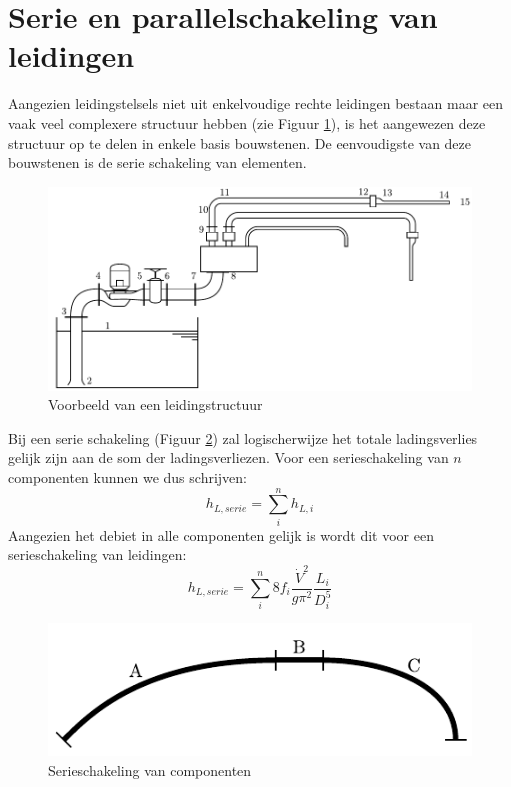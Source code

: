	\section{Serie en parallelschakeling van leidingen}
	\label{sec:Serie en parallelschakeling van leidingen}
Aangezien leidingstelsels niet uit enkelvoudige rechte leidingen bestaan maar een vaak veel complexere structuur hebben (zie Figuur \ref{fig:leiding_structuur}), is het aangewezen deze structuur op te delen in enkele basis bouwstenen. De eenvoudigste van deze bouwstenen is de serie schakeling van elementen.
\begin{figure}
	\centering
	\includegraphics{fig/leidingstelsels/leiding_structuur}
	\caption{Voorbeeld van een leidingstructuur}
	\label{fig:leiding_structuur}
\end{figure}
Bij een serie schakeling (Figuur \ref{fig:serieschakeling}) zal logischerwijze het totale ladingsverlies gelijk zijn aan de som der ladingsverliezen. Voor een serieschakeling van $n$ componenten kunnen we dus schrijven:
\begin{equation}
h_{L,serie} = \sum_i^n h_{L,i}
\end{equation}
Aangezien het debiet in alle componenten gelijk is wordt dit voor een serieschakeling van leidingen:
\begin{equation}
	h_{L,serie} = \sum_i^n 8 f_i \frac{\dot{V}^2}{g \pi^2} \frac{L_i}{D^5_i}
	\label{eqn:ladingsverlies door leidingen in serie}
\end{equation}
\begin{figure}
	\centering
	\includegraphics{fig/leidingstelsels/serieschakeling}
	\caption{Serieschakeling van componenten}
	\label{fig:serieschakeling}
\end{figure}

